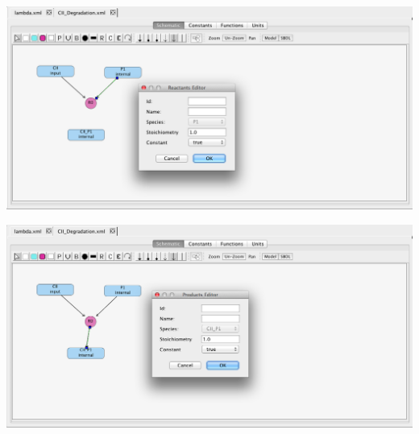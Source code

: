 \documentclass[titlepage,11pt]{article}
\begin{document}
\begin{center}
\includegraphics[width=155mm]{screenshots/reactant} 
\end{center}

\begin{center}
\includegraphics[width=155mm]{screenshots/product}
\end{center}
\end{document}
